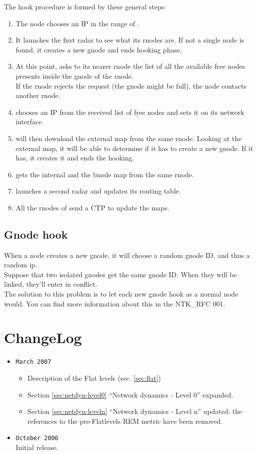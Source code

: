 \documentclass[a4paper]{article}
\begin{document}
The hook procedure is formed by these general steps:
\begin{enumerate}
	\item The node  chooses an IP in the range of .
	\item It launches the first radar to see what its rnodes are. If not a
		single node is found, it creates a new gnode and ends hooking
		phase.
	\item At this point,  asks to its nearer rnode the list of all the
		available free nodes presents inside the gnode of the rnode.\\
		If the rnode rejects the request (the gnode might be full),
		the node  contacts another rnode.
	\item  chooses an IP from the received list of free nodes and sets
		it on its network interface.
	\item  will then download the external map from the same rnode.
		Looking at the external map, it will be able to determine if
		it has to create a new gnode. If it has, it creates it and
		ends the hooking.
	\item  gets the internal and the bnode map from the same rnode.
	\item  launches a second radar and updates its routing table.
	\item All the rnodes of  send a CTP to update the maps.
\end{enumerate}


\subsection{Gnode hook}
When a node creates a new gnode, it will choose a random gnode ID, and thus
a random ip.\\
Suppose that two isolated gnodes get the same gnode ID. When they will be
linked, they'll enter in conflict.\\
The solution to this problem is to let each new gnode hook as a normal node
would. You can find more information about this in the NTK\_RFC 001\cite{gnodecontiguity}.





\section{ChangeLog}
\begin{itemize}
	\item \verb|March 2007|
		\begin{itemize}
			\item Description of the Flat levels (sec. \ref{sec:flat})
			\item Section \ref{sec:netdyn-level0} ``Network dynamics - Level 0'' expanded.
			\item Section \ref{sec:netdyn-leveln} ``Network
				dynamics - Level n'' updated: the references to
				the pre-Flatlevels REM metric have been
				removed.
		\end{itemize}
	\item \verb|October 2006|\\
		Initial release.
\end{itemize}
\end{document}
